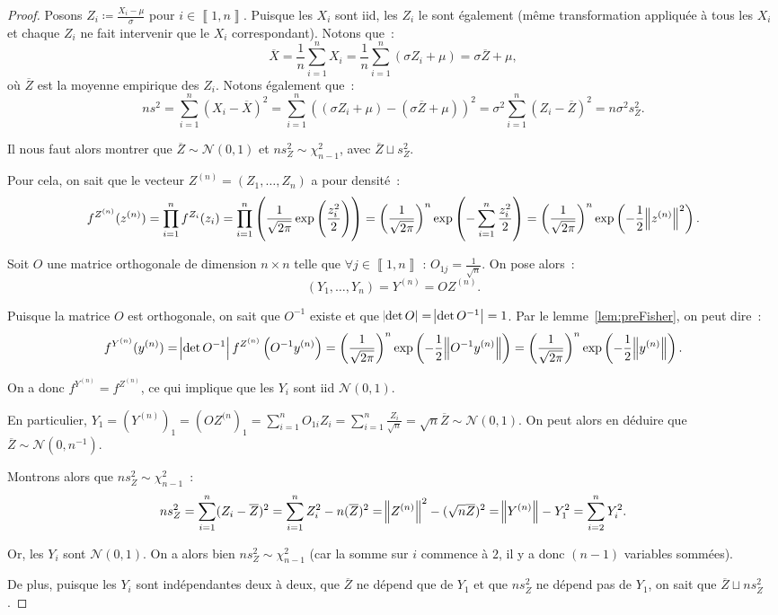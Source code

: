 \documentclass{report}
\newcommand{\Nzo}{\mathcal N(0, 1)}
\newcommand{\intint}[2]{\left\llbracket#1, #2\right\rrbracket}
\theoremstyle{definition}
\theoremstyle{remark}
\begin{document}
		\begin{proof} Posons $Z_i \coloneqq \frac {X_i - \mu}\sigma$ pour $i \in \intint 1n$. Puisque les $X_i$ sont iid, les $Z_i$ le sont également (même
		transformation appliquée à tous les $X_i$ et chaque $Z_i$ ne fait intervenir que le $X_i$ correspondant). Notons que~:
		\[\overline X = \frac 1n\sum_{i=1}^nX_i = \frac 1n\sum_{i=1}^n\left(\sigma Z_i + \mu\right) = \sigma\overline Z + \mu,\]
		où $\overline Z$ est la moyenne empirique des $Z_i$. Notons également que~:
		\[ns^2 = \sum_{i=1}^n(X_i - \overline X)^2 = \sum_{i=1}^n\left(\left(\sigma Z_i + \mu\right) - \left(\sigma\overline Z + \mu\right)\right)^2
			= \sigma^2\sum_{i=1}^n\left(Z_i - \overline Z\right)^2 = n\sigma^2s_Z^2.\]

		Il nous faut alors montrer que $\overline Z \sim \Nzo$ et $ns_Z^2 \sim \chi^2_{n-1}$, avec $\overline Z \sqcup s_Z^2$.

		Pour cela, on sait que le vecteur $Z^{(n)} = (Z_1, \ldots, Z_n)$ a pour densité~:
		\[f^{Z^{(n)}}(z^{(n)}) = \prod_{i=1}^nf^{Z_i}(z_i) = \prod_{i=1}^n\left(\frac 1{\sqrt {2\pi}}\exp\left(\frac {z_i^2}2\right)\right)
			= \left(\frac 1{\sqrt {2\pi}}\right)^n\exp\left(-\sum_{i=1}^n\frac {z_i^2}2\right)
			= \left(\frac 1{\sqrt {2\pi}}\right)^n\exp\left(-\frac 12\norm {z^{(n)}}^2\right).\]

		Soit $O$ une matrice orthogonale de dimension $n \times n$ telle que $\forall j \in \intint 1n$ : $O_{1j} = \frac 1{\sqrt n}$. On pose alors~:
		\[(Y_1, \ldots, Y_n) = Y^{(n)} = OZ^{(n)}.\]

		Puisque la matrice $O$ est orthogonale, on sait que $O^{-1}$ existe et que $\abs {\det O} = \abs {\det O^{-1}} = 1$. Par le lemme~\ref{lem:preFisher},
		on peut dire~:
		\[f^{Y^{(n)}}(y^{(n)}) = \abs {\det O^{-1}}f^{Z^{(n)}}\left(O^{-1}y^{(n)}\right)
			= \left(\frac 1{\sqrt {2\pi}}\right)^n\exp\left(-\frac 12\norm {O^{-1}y^{(n)}}\right)
			= \left(\frac 1{\sqrt {2\pi}}\right)^n\exp\left(-\frac 12\norm {y^{(n)}}\right).\]

		On a donc $f^{Y^{(n)}} = f^{Z^{(n)}}$, ce qui implique que les $Y_i$ sont iid $\Nzo$.

		En particulier, $Y_1 = (Y^{(n)})_1 = (OZ^{(n})_1 = \sum_{i=1}^nO_{1i}Z_i = \sum_{i=1}^n\frac {Z_i}{\sqrt n} = \sqrt n\overline Z \sim \Nzo$.
		On peut alors en déduire que $\overline Z \sim \mathcal N(0, n^{-1})$.

		Montrons alors que $ns_Z^2 \sim \chi^2_{n-1}$~:
		\[ns_Z^2 = \sum_{i=1}^n(Z_i - \overline Z)^2 = \sum_{i=1}^nZ_i^2 - n(\overline Z)^2 = \norm {Z^{(n)}}^2 - (\sqrt n\overline Z)^2 = \norm{Y^{(n)}} - Y_1^2
			= \sum_{i=2}^nY_i^2.\]

		Or, les $Y_i$ sont $\Nzo$. On a alors bien $ns_Z^2 \sim \chi^2_{n-1}$ (car la somme sur $i$ commence à $2$, il y a donc $(n-1)$ variables sommées).

		De plus, puisque les $Y_i$ sont indépendantes deux à deux, que $\overline Z$ ne dépend que de $Y_1$ et que $ns_Z^2$ ne dépend pas de $Y_1$, on sait que
		$\overline Z \sqcup ns_Z^2$.
		\end{proof}
		
\end{document}
